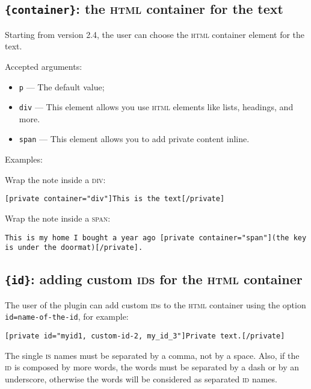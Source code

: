 \subsection{\texttt{\{container\}}: the \textsc{html} container for the text}

Starting from version 2.4, the user can choose the \textsc{html} container
element for the text.

Accepted arguments:

\begin{itemize}
 \item \verb+p+ --- The default value;
 \item \verb+div+ --- This element allows you use \textsc{html} elements like
 lists, headings, and more.
 \item \verb+span+ --- This element allows you to add private content inline.
\end{itemize}

Examples:

Wrap the note inside a \textsc{div}:

\begin{lstlisting}
[private container="div"]This is the text[/private]
\end{lstlisting}

Wrap the note inside a \textsc{span}:

\begin{lstlisting}
This is my home I bought a year ago [private container="span"](the key is under the doormat)[/private].
\end{lstlisting}


\subsection{\texttt{\{id\}}: adding custom \textsc{id}s for the \textsc{html} container}

The user of the plugin can add custom \textsc{id}s to the \textsc{html}
container using the option \verb+id=name-of-the-id+, for example:

\begin{lstlisting}
[private id="myid1, custom-id-2, my_id_3"]Private text.[/private]
\end{lstlisting}

The single \textsc{is} names must be separated by a comma, not by a space. Also,
if the \textsc{id} is composed by more words, the words must be separated by a
dash or by an underscore, otherwise the words will be considered as separated
\textsc{id} names.


